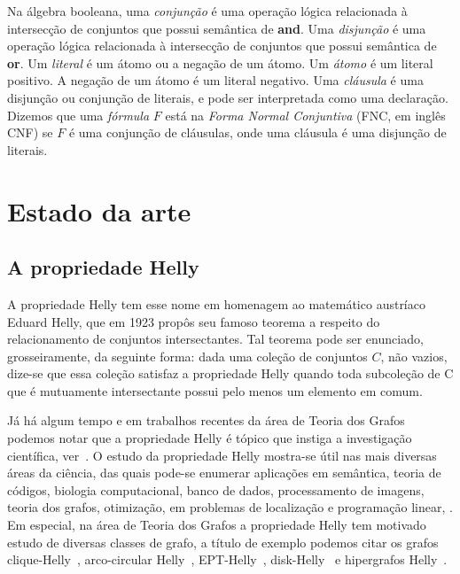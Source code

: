 Na álgebra booleana, uma \emph{conjunção} é uma operação lógica relacionada à intersecção de conjuntos que possui semântica de \textbf{and}. Uma \emph{disjunção} é uma operação lógica relacionada à intersecção de conjuntos que possui semântica de \textbf{or}. Um \emph{literal} é um átomo ou a negação de um átomo. Um \emph{átomo} é um literal positivo. A negação de um átomo é um literal negativo. Uma \emph{cláusula} é uma disjunção ou conjunção de literais, e pode ser interpretada como uma declaração. Dizemos que uma \emph{fórmula} $F$ está na \emph{Forma Normal Conjuntiva} (FNC, em inglês CNF) se $F$ é uma conjunção de cláusulas, onde uma cláusula é uma disjunção de literais.

\section{Estado da arte}

\subsection{A propriedade Helly}

A propriedade Helly tem esse nome em homenagem ao matemático austríaco Eduard Helly, que em 1923 propôs seu famoso teorema a respeito do relacionamento de conjuntos intersectantes. Tal teorema pode ser enunciado, grosseiramente, da seguinte forma: dada uma coleção de conjuntos $C$, não vazios, dize-se que essa coleção satisfaz a propriedade Helly quando toda subcoleção de C que é mutuamente intersectante possui pelo menos um elemento em comum. %

Já há algum tempo e em trabalhos recentes da área de Teoria dos Grafos podemos notar que a propriedade Helly é tópico que instiga a investigação científica, %
ver~\cite{berge1973,bergeDuchet1975,golumbic2013, teles2016,jose2018}.
O estudo da propriedade Helly mostra-se útil nas mais diversas áreas da ciência, das quais  pode-se enumerar aplicações em  semântica, teoria de códigos, biologia computacional, banco de dados, processamento de imagens, teoria dos grafos, otimização, em problemas de localização e programação linear, \cite{teles2016}. Em especial, na área de Teoria dos Grafos a propriedade Helly tem motivado estudo de  diversas classes de grafo, a título de exemplo podemos citar os grafos clique-Helly~\cite{DOURADO2008}, arco-circular Helly~\cite{safe2016essential}, EPT-Helly~\cite{alcon2017helly}, disk-Helly~\cite{lin2007faster} e hipergrafos Helly~\cite{mulder1979median}.

